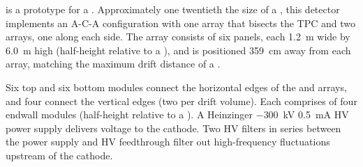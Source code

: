 

 \cite{Abi:2017aow} is a prototype for a . %
Approximately one twentieth the size of a , this detector implements an A-C-A configuration with one  array that bisects the TPC and two  arrays, one along each side. 
The  array consists of %
six  panels, each \SI{1.2}{m} wide by \SI{6.0}{m} high (half-height relative to a ), 
and is positioned \SI{359}{cm} away from each  array, matching the maximum drift distance of a .

Six top and six bottom  modules connect the horizontal edges of the  and  arrays, and four %
 connect the vertical edges (two per drift volume).
Each  comprises of four endwall modules (half-height relative to a ).
A Heinzinger $-$\SI{300}{kV} \SI{0.5}{mA} HV power supply delivers voltage to the cathode.
Two HV filters in series between the power supply and HV feedthrough filter out high-frequency fluctuations upstream of the cathode.

